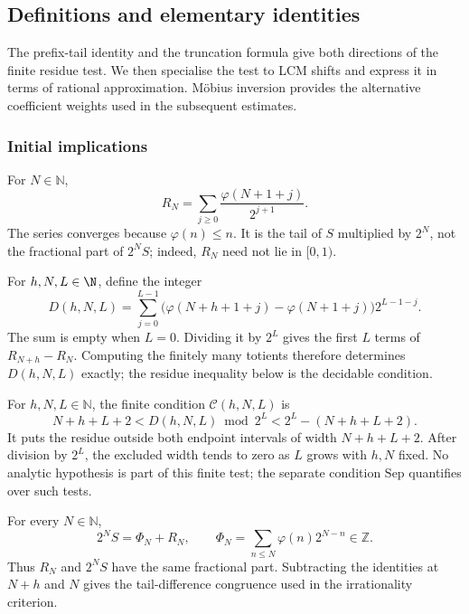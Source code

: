 \subsection{Definitions and elementary identities}

The prefix-tail identity and the truncation formula give both
directions of the finite residue test. We then specialise the test to
LCM shifts and express it in terms of rational approximation.
M\"obius inversion provides the alternative coefficient weights used
in the subsequent estimates.

\subsubsection{Initial implications}

\begin{defn}\label{catalogue:cert:a1}
For $N\in\mathbb N$,
\[
 R_N=\sum_{j\ge0}\frac{\varphi(N+1+j)}{2^{j+1}}.
\]
The series converges because $\varphi(n)\le n$. It is the tail of $S$
multiplied by $2^N$, not the fractional part of $2^NS$; indeed, $R_N$
need not lie in $[0,1)$.
\end{defn}

\begin{defn}\label{catalogue:cert:a3}
For $h,N,L\in\N$, define the integer
\[
 D(h,N,L)=\sum_{j=0}^{L-1}
 \bigl(\varphi(N+h+1+j)-\varphi(N+1+j)\bigr)2^{L-1-j}.
\]
The sum is empty when $L=0$. Dividing it by $2^L$ gives the first
$L$ terms of $R_{N+h}-R_N$. Computing the finitely many totients
therefore determines $D(h,N,L)$ exactly; the residue inequality below
is the decidable condition.
\end{defn}

\begin{defn}\label{catalogue:cert:a4}
For $h,N,L\in\mathbb N$, the finite condition $\mathcal C(h,N,L)$ is
\[
 N+h+L+2<D(h,N,L)\bmod2^L<2^L-(N+h+L+2).
\]
It puts the residue outside both endpoint intervals of width $N+h+L+2$.
After division by $2^L$, the excluded width tends to zero as $L$ grows
with $h,N$ fixed. No analytic hypothesis is part of this finite test;
the separate condition $\mathrm{Sep}$ quantifies over such tests.
\end{defn}

\begin{prop}\label{catalogue:cert:a2}
For every $N\in\mathbb N$,
\[
 2^NS=\Phi_N+R_N,
 \qquad \Phi_N=\sum_{n\le N}\varphi(n)2^{N-n}\in\mathbb Z.
\]
Thus $R_N$ and $2^NS$ have the same fractional part. Subtracting the
identities at $N+h$ and $N$ gives the tail-difference congruence used in
the irrationality criterion.
\end{prop}


